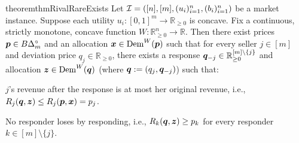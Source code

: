 \begin{restatable}{theorem}{thmRivalRareExists}
\label{thm:rival-rare-exists}
Let $\mathcal{I} = ([n], [m], (u_i)_{i=1}^n, (b_i)_{i=1}^n)$ be a market instance.
Suppose each utility $u_i: [0,1]^m \to \mathbb{R}_{\ge 0}$ is concave.
Fix a continuous, strictly monotone, concave function $W: \mathbb{R}_{\ge 0}^n \to \mathbb{R}$.
Then there exist prices $\bm{p} \in B\Delta_m^{\circ}$ and an allocation $\bm{x} \in \operatorname{Dem}^W(\bm{p})$
such that for every seller $j \in [m]$ and deviation price $q_j \in \mathbb{R}_{\ge 0}$,
there exists a response $\bm{q}_{-j} \in \mathbb{R}_{\ge 0}^{[m]\setminus\{j\}}$ and allocation $\bm{z} \in \operatorname{Dem}^W(\bm{q})$
(where $\bm{q} := (q_j, \bm{q}_{-j})$) such that:
\begin{tightenum}
\item $j$'s revenue after the response is at most her original revenue, i.e.,
    $R_j(\bm{q}, \bm{z}) \le R_j(\bm{p}, \bm{x}) = p_j$.
\item No responder loses by responding, i.e., $R_k(\bm{q}, \bm{z}) \ge p_k$
    for every responder $k \in [m] \setminus \{j\}$.
\end{tightenum}
\end{restatable}
